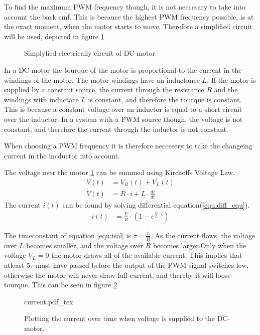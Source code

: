 \documentclass[../../../Main]{subfiles}
\begin{document}
To find the maximum PWM frequency though, it is not neccesary to take into account the back emf. This is because the highest PWM frequency possible, is at the exact moment, when the motor starts to move. Therefore a simplified circuit will be used, depicted in figure \ref{fig:electrical} 

\begin{figure}[H]
	\center
	
	\caption{Simplyfied electrically circuit of DC-motor}
  \label{fig:electrical}
\end{figure}


In a DC-motor the tourque of the motor is proportional to the current in the windings of the motor. The motor windings have an inductance $L$.
If the motor is supplied by a constant source, the current through the resistance $R$ and the windings with inductace $L$ is constant, and therefore the tourque is constant. This is because a constant voltage over an inductor is equal to a short circuit over the inductor. 
In a system with a PWM source though, the voltage is not constant, and therefore the current through the inductor is not constant.

When choosing a PWM frequency it is therefore neccesery to take the changeing current in the incductor into account. 

The voltage over the motor \ref{fig:electrical} can be summed using Kirchoffs Voltage Law. 
\begin{align}
	V(t) &= V_R(t) + V_L(t)\\
	V(t) &= R \cdot i + L \cdot \frac{di}{dt}
	\label{equ:diff_equ}
\end{align}
The current $i(t)$ can be found by solving differential equation(\ref{equ:diff_equ}).   
\begin{align}
	i(t) &=\frac{V}{R} \cdot (1-e^{\frac{R}{L} \cdot t})
	\label{equ:isol}
\end{align}

The timeconstant of equation \ref{equ:isol} is $\tau = \frac{L}{R}$.
As the current flows, the voltage over $L$ becomes smaller, and the voltage over $R$ becomes larger.Only when the voltage $V_L = 0$ the motor draws all of the available current. This implies that atleast $5\tau$ must have passed before the output of the PWM signal switches low, otherwise the motor will never draw full current, and thereby it will loose tourque. This can be seen in figure \ref{fig:currentplot}

\begin{figure}[H]
\centering
\def\svgwidth{\textwidth}
{current.pdf_tex}
\caption{Plotting the current over time when voltage is supplied to the DC-motor.}
\label{fig:currentplot}
\end{figure}
\end{document}
